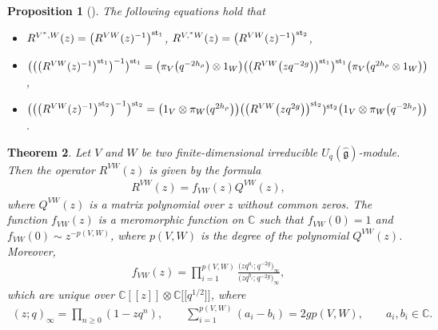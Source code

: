 \documentclass[pdftex]{sigma}
\numberwithin{equation}{section}
\newtheorem{Theorem}{Theorem}[section]
\newtheorem{Proposition}[Theorem]{Proposition}
 { \theoremstyle{definition}
\newtheorem{Definition}[Theorem]{Definition}
\newtheorem{Note}[Theorem]{Note}
\newtheorem{Example}[Theorem]{Example}
\newtheorem{Remark}[Theorem]{Remark} }
\begin{document}
\begin{Proposition}[{\cite[equations (2.30) and (2.32)]{MDGY}}]\label{R:V-W} The following equations hold that\samepage
\begin{itemize}\itemsep=0pt
\item[$(1)$] $R^{V^\ast, W}(z)=\bigl(R^{VW}(z)^{-1}\bigr)^{{\rm st}_1}$, $R^{V, ^\ast W}(z)=\bigl(R^{VW}(z)^{-1}\bigr)^{{\rm st}_2}$,
\item[$(2)$] $ \bigl(\bigl(\bigl(R^{VW}(z)^{-1}\bigr)^{{\rm st}_1}\bigr)^{-1}\bigr)^{{\rm st}_1}=\bigl(\pi_V\bigl(q^{-2h_\rho}\bigr)\otimes1_W\bigr)
\bigl(\bigl(R^{VW}\bigl(zq^{-2g}\bigr)\bigr)^{{\rm st}_1}\bigr)^{{\rm st}_1}\bigl(\pi_V\bigl(q^{2h_\rho}\otimes1_W\bigr)\bigr)$,
\item[$(3)$] $ \bigl(\bigl(\bigl(R^{VW}(z)^{-1}\bigr)^{{\rm st}_2}\bigr)^{-1}\bigr)^{{\rm st}_2}=\bigl(1_V\otimes\pi_W(q^{2h_\rho}\bigr)\bigr)
\bigl(\bigl(R^{VW}\bigl(zq^{2g}\bigr)\bigr)^{{\rm st}_2})^{{\rm st}_2}\bigl(1_V\otimes\pi_W\bigl(q^{-2h_\rho}\bigr)\bigr)$.
\end{itemize}
\end{Proposition}

\begin{Theorem}\label{RVWQVW}
Let $V$ and $W$ be two finite-dimensional irreducible $U_q(\mathfrak{\hat{g}})$-module. Then the operator $R^{VW}(z)$ is given by the formula
\begin{gather}\label{formu1}
 R^{VW}(z)=f_{VW}(z)Q^{VW}(z),
\end{gather}where $Q^{VW}(z)$ is a matrix polynomial over $z$ without common zeros. The function $f_{VW}(z)$ is a meromorphic function on $\mathbb{C}$ such that $f_{VW}(0)=1$ and $f_{VW}(0)\sim z^{-p(V,W)}$, where $p(V,W)$ is the degree of the polynomial $Q^{VW}(z)$. Moreover,
\begin{gather}\label{formu2}
 f_{VW}(z)=\prod\limits_{i=1}^{p(V,W)}\frac{\bigl(zq^{a_i}; q^{-2g}\bigr)_\infty}{\bigl(zq^{b_i}; q^{-2g}\bigr)_\infty},
\end{gather}
which are unique over $\mathbb{C}[[z]]\otimes\mathbb{C}\bigl[\bigl[q^{1/2}\bigr]\bigr]$, where
\begin{gather*}
 (z; q)_\infty=\prod\limits_{n\geq0}(1-zq^n), \qquad \sum_{i=1}^{p(V,W)}(a_i-b_i)=2gp(V,W),\qquad a_i, b_i\in\mathbb{C}.
\end{gather*}
\end{Theorem}
\end{document}
